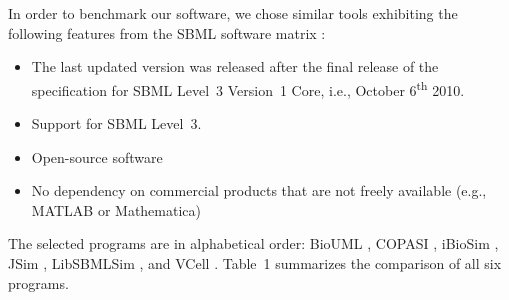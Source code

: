 \documentclass[10pt]{bmc_article}
\newenvironment{bmcformat}{\begin{raggedright}\baselineskip20pt\sloppy\setboolean{publ}{false}}{\end{raggedright}\baselineskip20pt\sloppy}
\begin{document}
\begin{bmcformat}
In order to benchmark our software, we chose similar tools exhibiting the
following features from the \acs{SBML} software
matrix :
%
%
\begin{itemize}
  \item The last updated version was released after the final release of
  the specification for \acs{SBML} Level~3 Version~1 Core, i.e., October
  6\textsuperscript{th} 2010.
  \item Support for \acs{SBML} Level~3.
  \item Open-source software
  \item No dependency on commercial products that are not freely available
  (e.g., MATLAB\texttrademark{} or Mathematica\texttrademark)
\end{itemize}
The selected programs are in alphabetical order:
BioUML \cite{Kolpakov2011}, COPASI \cite{Hoops2006}, 
iBioSim \cite{Myers2009}, JSim \cite{Raymond2003}, LibSBMLSim 
\cite{Takizawa2013}, and VCell .
Table~1 summarizes the comparison of  all six
programs. 



\end{bmcformat}
\end{document}
